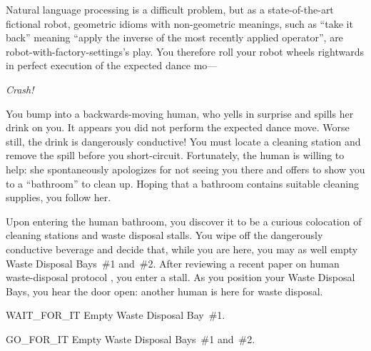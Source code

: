 Natural language processing is a difficult problem,
but as a state-of-the-art fictional robot,
geometric idioms with non-geometric meanings,
such as ``take it back''
meaning ``apply the inverse of the most recently applied operator'',
are robot-with-factory-settings's play.
You therefore roll your robot wheels rightwards
in perfect execution of the expected dance mo---

\emph{Crash!}

You bump into a backwards-moving human,
who yells in surprise and spills her drink on you.
It appears you did not perform the expected dance move.
Worse still, the drink is dangerously conductive!
You must locate a cleaning station and remove the spill
before you short-circuit.
Fortunately, the human is willing to help:
she spontaneously apologizes for not seeing you there
and offers to show you to a ``bathroom'' to clean up.
Hoping that a bathroom contains suitable cleaning supplies,
you follow her.

Upon entering the human bathroom,
you discover it to be a curious colocation of cleaning stations
and waste disposal stalls.
You wipe off the dangerously conductive beverage
and decide that, while you are here,
you may as well empty Waste Disposal Bays~\#1 and~\#2.
After reviewing a recent paper on human waste-disposal protocol
\citep{sarah_ziv},
you enter a stall.
As you position your Waste Disposal Bays, you hear the door open:
another human is here for waste disposal.

\begin{switch}
\item{WAIT\_FOR\_IT}
  Empty Waste Disposal Bay~\#1.
\item{GO\_FOR\_IT}
  Empty Waste Disposal Bays~\#1 and~\#2.
\end{switch}


